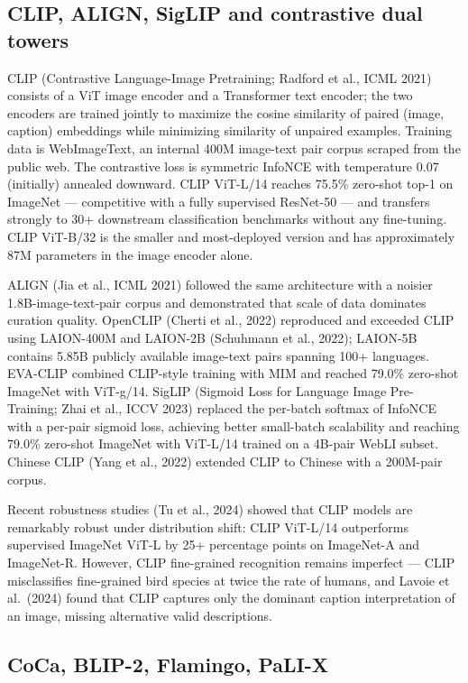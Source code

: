 \subsection{CLIP, ALIGN, SigLIP and contrastive dual towers}\label{clip-align-siglip-and-contrastive-dual-towers}

CLIP (Contrastive Language-Image Pretraining; Radford et al., ICML 2021) consists of a ViT image encoder and a Transformer text encoder; the two encoders are trained jointly to maximize the cosine similarity of paired (image, caption) embeddings while minimizing similarity of unpaired examples. Training data is WebImageText, an internal 400M image-text pair corpus scraped from the public web. The contrastive loss is symmetric InfoNCE with temperature 0.07 (initially) annealed downward. CLIP ViT-L/14 reaches 75.5\% zero-shot top-1 on ImageNet --- competitive with a fully supervised ResNet-50 --- and transfers strongly to 30+ downstream classification benchmarks without any fine-tuning. CLIP ViT-B/32 is the smaller and most-deployed version and has approximately 87M parameters in the image encoder alone.

ALIGN (Jia et al., ICML 2021) followed the same architecture with a noisier 1.8B-image-text-pair corpus and demonstrated that scale of data dominates curation quality. OpenCLIP (Cherti et al., 2022) reproduced and exceeded CLIP using LAION-400M and LAION-2B (Schuhmann et al., 2022); LAION-5B contains 5.85B publicly available image-text pairs spanning 100+ languages. EVA-CLIP combined CLIP-style training with MIM and reached 79.0\% zero-shot ImageNet with ViT-g/14. SigLIP (Sigmoid Loss for Language Image Pre-Training; Zhai et al., ICCV 2023) replaced the per-batch softmax of InfoNCE with a per-pair sigmoid loss, achieving better small-batch scalability and reaching 79.0\% zero-shot ImageNet with ViT-L/14 trained on a 4B-pair WebLI subset. Chinese CLIP (Yang et al., 2022) extended CLIP to Chinese with a 200M-pair corpus.

Recent robustness studies (Tu et al., 2024) showed that CLIP models are remarkably robust under distribution shift: CLIP ViT-L/14 outperforms supervised ImageNet ViT-L by 25+ percentage points on ImageNet-A and ImageNet-R. However, CLIP fine-grained recognition remains imperfect --- CLIP misclassifies fine-grained bird species at twice the rate of humans, and Lavoie et al.~(2024) found that CLIP captures only the dominant caption interpretation of an image, missing alternative valid descriptions.

\subsection{CoCa, BLIP-2, Flamingo, PaLI-X}\label{coca-blip-2-flamingo-pali-x}

